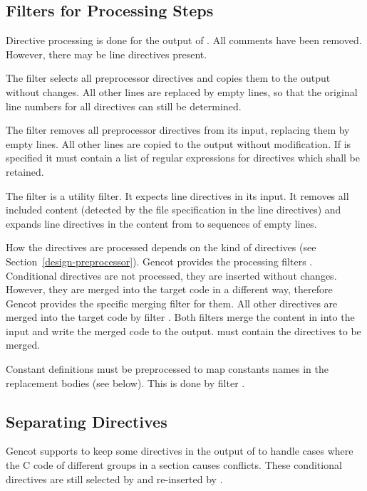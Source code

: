 \subsection{Filters for Processing Steps}

Directive processing is done for the output of . All comments have been removed. 
However, there may be line directives present. 

The filter  selects all preprocessor directives and
copies them to the output without changes. All other lines are replaced by empty lines, so that the original
line numbers for all directives can still be determined. 

The filter  removes all preprocessor directives from its input, replacing them by empty
lines. All other lines are copied to the output without modification. If  is specified it must 
contain a list of regular expressions for directives which shall be retained.

The filter  is a utility filter. It expects line directives in its input. It removes all
included content (detected by the file specification in the line directives) and expands line directives
in the content from  to sequences of empty lines.

How the directives are processed depends on the kind of directives (see Section~\ref{design-preprocessor}).
Gencot provides the processing filters . 
Conditional directives are not processed, they are inserted
without changes. However, they are merged into the target code in a different way, therefore Gencot provides 
the specific merging filter  for them. All other directives are merged into the 
target code by filter . Both filters merge the content in  
into the input and write the merged code to the output.  must contain the directives to be merged.

Constant definitions must be preprocessed to map constants names in the replacement bodies (see below). This
is done by filter .

\subsection{Separating Directives}

Gencot supports to keep some directives in the output of  to handle cases where
the C code of different groups in a section causes conflicts. These conditional directives are still selected
by  and re-inserted by . 

